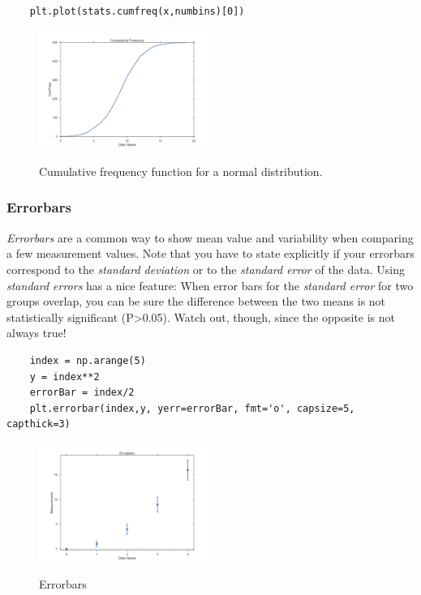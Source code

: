 \begin{lstlisting}
    plt.plot(stats.cumfreq(x,numbins)[0])
\end{lstlisting}

\begin{figure}[H]
  \centering
  \includegraphics[width=0.5\textwidth]{../Images/CumulativeFrequencyFunction.png}\\
  \caption{Cumulative frequency function for a normal distribution.}
\end{figure}

\subsubsection{Errorbars}

\emph{Errorbars} are a common way to show mean value and variability when comparing a few measurement values. Note that you have to state explicitly if your errorbars correspond to the \emph{standard deviation} or to the \emph{standard error} of the data. Using \emph{standard errors} has a nice feature: When error bars for the \emph{standard error} for two groups overlap, you can be sure the difference between the two means is not statistically significant (P>0.05). Watch out, though, since the opposite is not always true!

\begin{lstlisting}
    index = np.arange(5)
    y = index**2
    errorBar = index/2
    plt.errorbar(index,y, yerr=errorBar, fmt='o', capsize=5, capthick=3)
\end{lstlisting}

\begin{figure}[H]
  \centering
  \includegraphics[width=0.5\textwidth]{../Images/Errorbars.png}\\
  \caption{Errorbars}
\end{figure}

